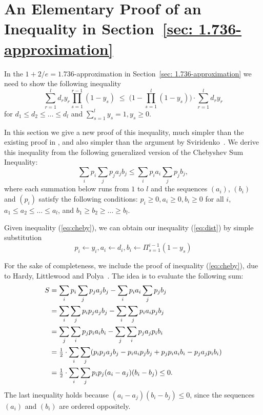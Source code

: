 \documentclass[11pt]{article}
\begin{document}
\section{An Elementary Proof of an Inequality in Section~\ref{sec:
    1.736-approximation}}
In the $1+2/e=1.736$-approximation in Section~\ref{sec: 1.736-approximation}
we need to show the following inequality
%
\begin{equation}
  \label{eq:dist}
\sum_{r=1}^l d_ry_r\prod_{s=1}^{r-1}(1-y_s)
  \;\leq\;  \Big(1 - \prod_{s=1}^l (1-y_s)\Big) \cdot \sum_{r=1}^l d_r y_r
\end{equation}
%
for $d_1\leq d_2 \leq \ldots \leq d_l$ and $\sum_{s=1}^l y_s = 1, y_s \geq 0$.

In this section we give a new proof of this inequality, much
simpler than the existing proof in \cite{ChudakS04}, and also simpler than
the argument by Sviridenko~\cite{Svi02}.  
We derive this inequality from the following generalized version of the Chebyshev Sum
Inequality:
%
\begin{equation}
  \label{eq:cheby}
  \sum_{i} p_i \sum_j p_j a_j b_j \leq \sum_i p_i a_i \sum_j p_j b_j,
\end{equation}
%
where each summation below runs from $1$ to $l$ and the sequences 
$(a_i)$, $(b_i)$ and $(p_i)$ satisfy the following conditions:
$p_i\geq 0, a_i \geq 0, b_i \geq 0$ for all $i$, $a_1\leq a_2 \leq
\ldots \leq a_l$, and $b_1 \geq b_2 \geq \ldots \geq b_l$.

Given inequality (\ref{eq:cheby}), we can obtain our inequality
(\ref{eq:dist}) by simple substitution
%
\begin{equation*}
  p_i \leftarrow y_i, a_i \leftarrow d_i, b_i \leftarrow
  \Pi_{s=1}^{i-1} (1-y_s)
\end{equation*}

For the sake of completeness, we include the proof of inequality (\ref{eq:cheby}), 
due to Hardy, Littlewood and Polya~\cite{HardyLP88}. The idea is to evaluate the 
following sum:
%
\begin{align*}
  S &= \sum_i p_i \sum_j p_j a_j b_j - \sum_i p_i a_i \sum_j p_j b_j
	\\
  & = \sum_i \sum_j p_i p_j a_j b_j - \sum_i \sum_j p_i a_i p_j b_j
	\\
  & = \sum_j \sum_i p_j p_i a_i b_i - \sum_j \sum _i p_j a_j p_i b_i
	\\
	&= {\mbox{$\frac{1}{2}$}} \cdot \sum_i \sum_j (p_i p_j a_j b_j - p_i a_i p_j b_j + p_j p_i a_i
  							b_i - p_j a_j p_i b_i)
\\
  &= {\mbox{$\frac{1}{2}$}} \cdot \sum_i \sum_j p_i p_j (a_i - a_j)(b_i - b_j) \leq 0.
\end{align*}
The last inequality holds because $(a_i-a_j)(b_i-b_j) \leq 0$, since the sequences
$(a_i)$ and $(b_i)$ are ordered oppositely.
\end{document}
